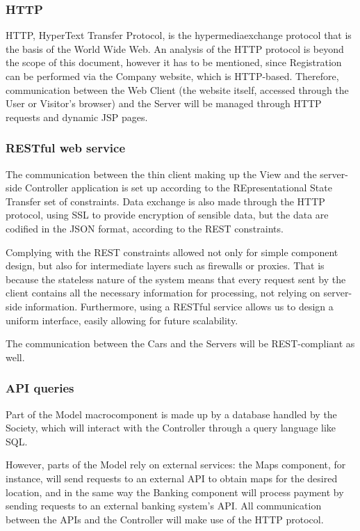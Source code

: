 \documentclass[12pt]{article}
\begin{document}
\subsubsection{HTTP}
HTTP, HyperText Transfer Protocol, is the hypermediaexchange protocol that is the basis of the World Wide Web. An analysis of the HTTP protocol is beyond the scope of this document, however it has to be mentioned, since Registration can be performed via the Company website, which is HTTP-based. Therefore, communication between the Web Client (the website itself, accessed through the User or Visitor's browser) and the Server will be managed through HTTP requests and dynamic JSP pages.
\subsubsection{RESTful web service}
The communication between the thin client making up the View and the server-side Controller application is set up according to the REpresentational State Transfer set of constraints. Data exchange is also made through the HTTP protocol, using SSL to provide encryption of sensible data, but the data are codified in the JSON format, according to the REST constraints.

Complying with the REST constraints allowed not only for simple component design, but also for intermediate layers such as firewalls or proxies. That is because the stateless nature of the system means that every request sent by the client contains all the necessary information for processing, not relying on server-side information. Furthermore, using a RESTful service allows us to design a uniform interface, easily allowing for future scalability.

The communication between the Cars and the Servers will be REST-compliant as well.

\subsubsection{API queries}
Part of the Model macrocomponent is made up by a database handled by the Society, which will interact with the Controller through a query language like SQL.

However, parts of the Model rely on external services: the Maps component, for instance, will send requests to an external API to obtain maps for the desired location, and in the same way the Banking component will process payment by sending requests to an external banking system's API. All communication between the APIs and the Controller will make use of the HTTP protocol.
\end{document}
